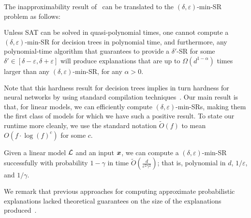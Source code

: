 The inapproximability result of~\citet{Kozachinskiy_2023} can be translated to the $(\delta, \varepsilon)$-min-SR problem as follows:
\begin{theorem}
    Unless SAT can be solved in quasi-polynomial times, one cannot compute a $(\delta, \varepsilon)$-min-SR for decision trees in polynomial time, and furthermore, any polynomial-time algorithm that guarantees to provide a $\delta'$-SR for some $\delta' \in [\delta-\varepsilon, \delta+\varepsilon]$ will produce explanations that are up to $\Omega(d^{1-\alpha})$ times larger than any $(\delta, \varepsilon)$-min-SR, for any $\alpha > 0$.
\end{theorem}
Note that this hardness result for decision trees implies in turn hardness for neural networks by using standard compilation techniques~\citep{NEURIPS2020_b1adda14}.
Our main result is that, for linear models, we can efficiently compute $(\delta, \varepsilon)$-min-SRs, making them the first class of models for which we have such a positive result. To state our runtime more cleanly, we use the standard notation $\widetilde{O}(f)$ to mean $O(f \cdot \log(f)^c)$ for some $c$. 
\begin{theorem}
    \label{prop:smoothed-explanation}
    Given a linear model $\mathcal{L}$ and an input ${\bm{x}}$, we can compute a $(\delta, \varepsilon)$-min-SR successfully with probability $1 - \gamma$ in time $\widetilde{O}\left( \frac{d}{\varepsilon^2\gamma^2}\right)$; that is, polynomial in $d$, $1/\varepsilon$, and $1/\gamma$.
\end{theorem}

We remark that previous approaches for computing approximate probabilistic explanations lacked theoretical guarantees on the size of the explanations produced~\citep{izzaComputingProbabilisticAbductive2023,Izza2021EfficientEW,izza2024locallyminimalprobabilisticexplanations}.



